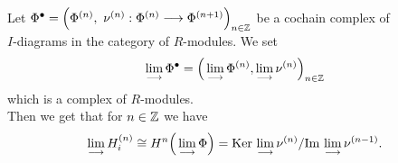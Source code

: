\documentclass[11pt, a4paper, twoside]{article}
\begin{document}
\begin{thm}
Let $\Phi^{\bullet}=\Big(\Phi^{(n)},\ \nu^{(n)}:\Phi^{(n)}\ra\Phi^{(n+1)}\Big)_{n\in\Z}$ be a cochain complex of\\ $I$-diagrams in the category of $R$-modules. We set 
\begin{displaymath}
    \lim\limits_{\longrightarrow}\Phi^{\bullet}=\Big(\lim\limits_{\longrightarrow}\Phi^{(n)},\lim\limits_{\longrightarrow}\nu^{(n)}\Big)_{n\in\mathbb{Z}}
\end{displaymath}
which is a complex of $R$-modules.\\
Then we get that for $n\in\mathbb{Z}$ we have
\begin{displaymath}
    \lim\limits_{\longrightarrow}H^{(n)}_i\cong H^n\Big(\lim\limits_{\longrightarrow}\Phi\Big)=\mathrm{Ker}\thinspace\lim\limits_{\longrightarrow}\nu^{(n)}/\mathrm{Im}\thinspace\lim\limits_{\longrightarrow}\nu^{(n-1)}.
\end{displaymath}
\end{thm}
\end{document}

